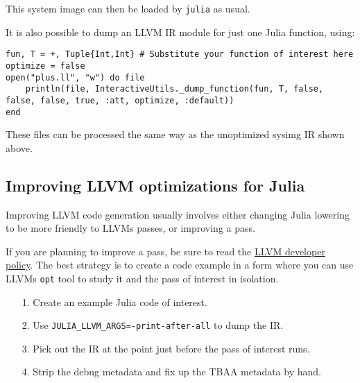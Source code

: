 This system image can then be loaded by \texttt{julia} as usual.



It is also possible to dump an LLVM IR module for just one Julia function, using:




\begin{verbatim}
fun, T = +, Tuple{Int,Int} # Substitute your function of interest here
optimize = false
open("plus.ll", "w") do file
    println(file, InteractiveUtils._dump_function(fun, T, false, false, false, true, :att, optimize, :default))
end
\end{verbatim}



These files can be processed the same way as the unoptimized sysimg IR shown above.



\hypertarget{18346154193244616171}{}


\subsection{Improving LLVM optimizations for Julia}



Improving LLVM code generation usually involves either changing Julia lowering to be more friendly to LLVM{\textquotesingle}s passes, or improving a pass.



If you are planning to improve a pass, be sure to read the \href{https://llvm.org/docs/DeveloperPolicy.html}{LLVM developer policy}. The best strategy is to create a code example in a form where you can use LLVM{\textquotesingle}s \texttt{opt} tool to study it and the pass of interest in isolation.



\begin{itemize}
\item[1. ] Create an example Julia code of interest.


\item[2. ] Use \texttt{JULIA\_LLVM\_ARGS=-print-after-all} to dump the IR.


\item[3. ] Pick out the IR at the point just before the pass of interest runs.


\item[4. ] Strip the debug metadata and fix up the TBAA metadata by hand.

\end{itemize}


